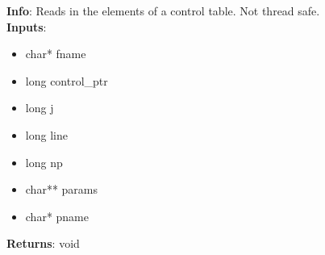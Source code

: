 \textbf{Info}: Reads in the elements of a control table. Not thread safe.\\

\noindent \textbf{Inputs}:
\begin{itemize}
\item{char* fname}
\item{long control\_ptr}
\item{long j}
\item{long line}
\item{long np}
\item{char** params}
\item{char* pname}
\end{itemize}

\noindent \textbf{Returns}: void
